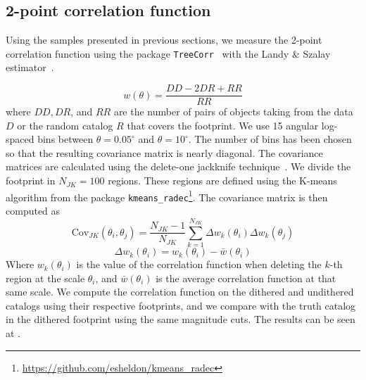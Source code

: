 \documentclass[\docopts]{\docclass}
\begin{document}
\subsection{2-point correlation function}
Using the samples presented in previous sections, we measure the 2-point correlation function using the package \texttt{TreeCorr}~\citep{2004MNRAS.352..338J} with the Landy \& Szalay estimator~\citep{1993ApJ...412...64L}.

\begin{equation}
w(\theta) = \frac{DD - 2 DR + RR}{RR}
\end{equation} 
where $DD, DR$, and $RR$ are the number of pairs of objects taking from the data $D$ or the random catalog $R$ that covers the footprint. We use 15 angular log-spaced bins between $\theta=0.05^{\circ}$ and $\theta=10^{\circ}$. The number of bins has been chosen so that the resulting covariance matrix is nearly diagonal. The covariance matrices are calculated using the delete-one jackknife technique~\citep{Shao:1986:DJB,2009MNRAS.396...19N}. We divide the footprint in $N_{JK}=100$ regions. These regions are defined using the K-means algorithm from the package \texttt{kmeans\_radec}\footnote{\url{https://github.com/esheldon/kmeans\_radec}}. The covariance matrix is then computed as
\begin{equation}
\mathrm{Cov}_{JK}(\theta_{i},\theta_{j})=\frac{N_{JK}-1}{N_{JK}}\sum_{k=1}^{N_{JK}}\Delta w_{k}(\theta_{i}) \Delta w_{k}(\theta_{j})
\end{equation}
\begin{equation}
\Delta w_{k}(\theta_{i}) = w_{k}(\theta_{i})-\bar{w}(\theta_{i})
\end{equation}
Where $w_{k}(\theta_{i})$ is the value of the correlation function when deleting the $k$-th region at the scale $\theta_{i}$, and $\bar{w}(\theta_{i})$ is the average correlation function at that same scale. We compute the correlation function on the dithered and undithered catalogs using their respective footprints, and we compare with the truth catalog in the dithered footprint using the same magnitude cuts. The results can be seen at . 
\end{document}

